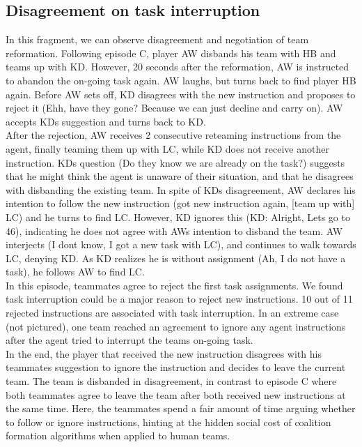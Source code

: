 \subsection{Disagreement on task interruption}

In this fragment, we can observe disagreement and negotiation of team reformation. Following episode C, player AW disbands his team with HB and teams up with KD. However, 20 seconds after the reformation, AW is instructed to abandon the on-going task again. AW laughs, but turns back to find player HB again. Before AW sets off, KD disagrees with the new instruction and proposes to reject it (Ehh, have they gone? Because we can just decline and carry on). AW accepts KDs suggestion and turns back to KD.\\

After the rejection, AW receives 2 consecutive reteaming instructions from the agent, finally teaming them up with LC, while KD does not receive another instruction. KDs question (Do they know we are already on the task?) suggests that he might think the agent is unaware of their situation, and that he disagrees with disbanding the existing team. In spite of KDs disagreement, AW declares his intention to follow the new instruction (got new instruction again, [team up with] LC) and he turns to find LC. However, KD ignores this (KD: Alright, Lets go to 46), indicating he does not agree with AWs intention to disband the team. AW interjects (I dont know, I got a new task with LC), and continues to walk towards LC, denying KD. As KD realizes he is without assignment (Ah, I do not have a task), he follows AW to find LC. \\

In this episode, teammates agree to reject the first task assignments. We found task interruption could be a major reason to reject new instructions. 10 out of 11 rejected instructions are associated with task interruption. In an extreme case (not pictured), one team reached an agreement to ignore any agent instructions after the agent tried to interrupt the teams on-going task. \\

In the end, the player that received the new instruction disagrees with his teammates suggestion to ignore the instruction and decides to leave the current team. The team is disbanded in disagreement, in contrast to episode C where both teammates agree to leave the team after both received new instructions at the same time. Here, the teammates spend a fair amount of time arguing whether to follow or ignore instructions, hinting at the hidden social cost of coalition formation algorithms when applied to human teams. \\

